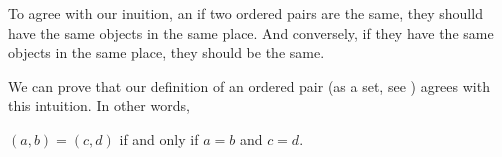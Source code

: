 

To agree with our inuition, an if two ordered pairs are the same, they shoulld have the same objects in the same place.
And conversely, if they have the same objects in the same place, they should be the same.


We can prove that our definition of an ordered pair (as a set, see ) agrees with this intuition.
In other words,

\begin{proposition}
  $(a, b) = (c, d)$ if and only if $a = b$ and $c = d$.
\end{proposition}

\blankpage

